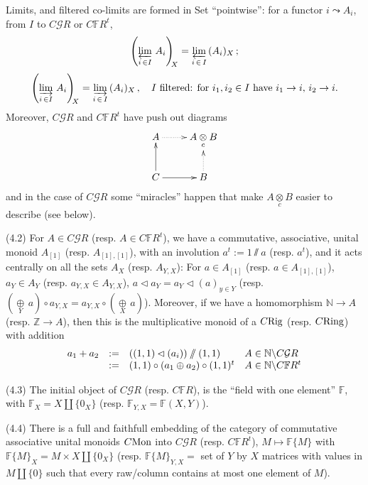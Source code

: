\documentclass[leqno]{article}
\numberwithin{equation}{section}
\begin{document}
Limits, and filtered co-limits are formed in Set ``pointwise'': for a functor $i \leadsto A_i$, from $I$ to $C{\mathcal G} R$ or $C{\mathbb F} R^t$,
$$
\left( \varprojlim_{i \, \in I} \, A_i \right)_{\!\!X} = \varprojlim_{i \, \in \, I} \, (A_i)_X \, ;
$$
$$
\left( \varinjlim_{i \, \in I} \, A_i \right)_{\!\!X} = \varinjlim_{i \, \in \, I} \, (A_i)_X \, , \quad \mbox{$I$ filtered: for $i_1 , i_2 \in I$ have $i_1 \to i$, $i_2 \to i$.}
$$
Moreover, $C{\mathcal G} R$ and $C{\mathbb F} R^t$ have push out diagrams
$$
\xymatrix{
A \ar@{.>}[r] &A \underset{c}{\otimes} B \\
C \ar[u] \ar[r] &B \ar@{.>}[u]
}
$$
and in the case of $C{\mathcal G} R$ some ``miracles'' happen that make $A \underset{c}{\otimes} B$ easier to describe (see below).

\bigskip

\noindent (4.2) \quad For $A \in C{\mathcal G} R$ (resp. $A \in C{\mathbb F} R^t$), we have a commutative, associative, unital monoid $A_{[1]}$ (resp. $A_{[1],[1]}$), with an involution $a^t := 1 \sslash a$ (resp. $a^t$), and it acts centrally on all the sets $A_X$ (resp. $A_{Y,X}$): For $a \in A_{[1]}$ (resp. $a \in A_{[1],[1]}$), $a_Y \in A_Y$ (resp. $a_{Y,X} \in A_{Y,X}$), $a \lhd a_Y = a_Y \lhd (a)_{y \in Y}$ (resp. $\left( \underset{Y}{\oplus} \, a \right) \circ a_{Y,X} = a_{Y,X} \circ \left( \underset{X}{\oplus} \, a \right)$). Moreover, if we have a homomorphism ${\mathbb N} \to A$ (resp. ${\mathbb Z} \to A$), then this is the multiplicative monoid of a $C{\rm Rig}$ (resp. $C{\rm Ring}$) with addition
$$
\begin{matrix}
a_1 + a_2 &:= &((1,1) \lhd (a_i)) \sslash (1,1) \hfill &A \in {\mathbb N} \backslash C{\mathcal G} R \hfill \\
&:= &(1,1) \circ (a_1 \oplus a_2) \circ (1,1)^t &A \in {\mathbb N} \backslash C{\mathbb F} R^t \nonumber
\end{matrix}
$$
 
\medskip

\noindent (4.3) \quad The initial object of $C{\mathcal G} R$ (resp. $C{\mathbb F} R$), is the ``field with one element'' ${\mathbb F}$, with ${\mathbb F}_X = X \amalg \{ 0_X \}$ (resp. ${\mathbb F}_{Y,X} = {\mathbb F} (X,Y)$).

\bigskip

\noindent (4.4) \quad There is a full and faithfull embedding of the category of commutative associative unital monoids $C{\rm Mon}$ into $C{\mathcal G} R$ (resp. $C{\mathbb F} R^t$), $M \mapsto {\mathbb F} \{M\}$ with ${\mathbb F} \{M\}_X = M \times X \amalg \{0_X \}$ (resp. ${\mathbb F} \{M\}_{Y,X} =$ set of $Y$ by $X$ matrices with values in $M \amalg \{0\}$ such that every raw/column contains at most one element of $M$).
\end{document}
